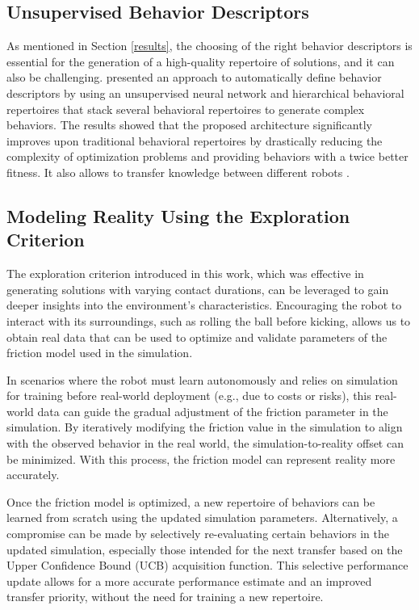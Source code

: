 \documentclass[12pt]{article}
\begin{document}
 \subsection{Unsupervised Behavior Descriptors}
 As mentioned in Section \ref{results}, the choosing of the right behavior descriptors is essential for the generation of a high-quality repertoire of solutions, and it can also be challenging. \citet{Cully_2018} presented an approach to automatically define behavior descriptors by using an unsupervised neural network and hierarchical behavioral repertoires that stack several behavioral repertoires to generate complex behaviors. The results showed that the proposed architecture significantly improves upon traditional behavioral repertoires by drastically reducing the complexity of optimization problems and providing behaviors with a twice better fitness. It also allows to transfer knowledge between different robots \citep{Cully_2018}. 
 
\subsection{Modeling Reality Using the Exploration Criterion}

The exploration criterion introduced in this work, which was effective in generating solutions with varying contact durations, can be leveraged to gain deeper insights into the environment’s characteristics. Encouraging the robot to interact with its surroundings, such as rolling the ball before kicking, allows us to obtain real data that can be used to optimize and validate parameters of the friction model used in the simulation.

In scenarios where the robot must learn autonomously and relies on simulation for training before real-world deployment (e.g., due to costs or risks), this real-world data can guide the gradual adjustment of the friction parameter in the simulation. By iteratively modifying the friction value in the simulation to align with the observed behavior in the real world, the simulation-to-reality offset can be minimized. With this process, the friction model can represent reality more accurately.

Once the friction model is optimized, a new repertoire of behaviors can be learned from scratch using the updated simulation parameters. Alternatively, a compromise can be made by selectively re-evaluating certain behaviors in the updated simulation, especially those intended for the next transfer based on the Upper Confidence Bound (UCB) acquisition function. This selective performance update allows for a more accurate performance estimate and an improved transfer priority, without the need for training a new repertoire.
\end{document}
